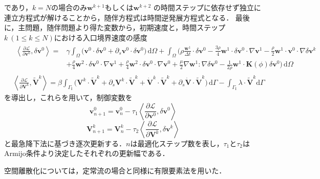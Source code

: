 であり，$k = N$の場合のみ$\mathbf{w}^{k+1}$もしくは$\mathbf{w}^{k+2}$
の時間ステップに依存せず独立に連立方程式が解けることから，随伴方程式は時間逆発展方程式となる．
最後に，主問題，随伴問題より得た変数から，初期速度と，時間ステップ$k \ (1 \leq k \leq N)$における入口境界速度の感度
\begin{align}
    \label{eq:adjoint_v0}
    &\begin{aligned}
        \left\langle\frac{\partial \mathcal{L}}{\partial \mathbf{v}^0}, \delta \mathbf{v}^0\right\rangle
        = & \gamma \int_{\Omega}  \big( \mathbf{v}^{0} \cdot \delta \mathbf{v}^0 
        + \partial_s \mathbf{v}^{0} \cdot \delta \mathbf{v}^0 \big) \, \mathrm{d}\Omega
        + \int_{\Omega} \bigg( \rho\frac{ \mathbf{w}^{1}}{\Delta t} \cdot \delta \mathbf{v}^0
        - \frac{3\rho}{4} \mathbf{w}^{1} \cdot \delta \mathbf{v}^0 \cdot \nabla \mathbf{v}^{1}
        - \frac{\rho}{2} \mathbf{w}^{1} \cdot \mathbf{v}^0 \cdot \nabla \delta \mathbf{v}^{k} \\
        &+ \frac{\rho}{4} \mathbf{w}^{2} \cdot \delta \mathbf{v}^{0} \cdot \nabla \mathbf{v}^1
        + \frac{\rho}{4} \mathbf{w}^{2} \cdot \delta \mathbf{v}^{0} \cdot \nabla \mathbf{v}^{0}
         + \frac{\mu}{2} \nabla \mathbf{w}^{1} : \nabla \delta \mathbf{v}^0
        - \frac{1}{2\rho} \mathbf{w}^{1} \cdot \mathbf{K}(\phi) \delta \mathbf{v}^0 
        \bigg) \, \mathrm{d}\Omega 
    \end{aligned} \\
    &\left\langle\frac{\partial \mathcal{L}}{\partial \mathbf{V}^k}, \widetilde{\mathbf{V}}^k\right\rangle
    = \beta \int_{\Gamma_\mathrm{I}} \big( \mathbf{V}^k \cdot \widetilde{\mathbf{V}}^k + \partial_s \mathbf{V}^k \cdot \widetilde{\mathbf{V}}^k + \dot{\mathbf{V}}^k \cdot \widetilde{\mathbf{V}}^k + \partial_s \dot{\mathbf{V}} \cdot \widetilde{\mathbf{V}}^k \big) \, \mathrm{d}\Gamma
    - \int_{\Gamma_\mathrm{I}} \lambda \cdot \widetilde{\mathbf{V}}^k \mathrm{d} \Gamma
\end{align}
を導出し，これらを用いて，制御変数を
\begin{equation}
    \mathbf{v}^0_{n+1} = \mathbf{v}^0_n - \tau_1\left\langle\frac{\partial \mathcal{L}}{\partial \mathbf{v}^0}, \delta \mathbf{v}^0\right\rangle
\end{equation}
\begin{equation}
    \mathbf{V}^k_{n+1}=\mathbf{V}^k_n - \tau_2\left\langle\frac{\partial \mathcal{L}}{\partial \mathbf{V}^k}, \delta \mathbf{v}^k\right\rangle
\end{equation}
と最急降下法に基づき逐次更新する．$n$は最適化ステップ数を表し，$\tau_1$と$\tau_2$はArmijo条件\cite{Armijo1966}より決定したそれぞれの更新幅である．\par
空間離散化については，定常流の場合と同様に有限要素法を用いた．

